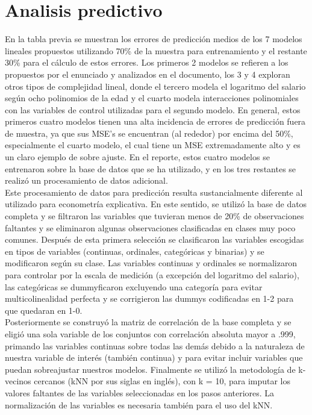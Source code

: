 \documentclass[12pt]{article}
\begin{document}
\section{Analisis predictivo}



En la tabla previa se muestran los errores de predicción medios de los 7 modelos lineales propuestos utilizando 70\% de la muestra para entrenamiento y el restante 30\% para el cálculo de estos errores. Los primeros 2 modelos se refieren a los propuestos por el enunciado y analizados en el documento, los 3 y 4 exploran otros tipos de complejidad lineal, donde el tercero modela el logaritmo del salario según ocho polinomios de la edad y el cuarto modela interacciones polinomiales con las variables de control utilizadas para el segundo modelo. En general, estos primeros cuatro modelos tienen una alta incidencia de errores de predicción fuera de muestra, ya que sus MSE’s se encuentran (al rededor) por encima del 50\%, especialmente el cuarto modelo, el cual tiene un MSE extremadamente alto y es un claro ejemplo de sobre ajuste. En el reporte, estos cuatro modelos se entrenaron sobre la base de datos que se ha utilizado, y en los tres restantes se realizó un procesamiento de datos adicional. \\

Este procesamiento de datos para predicción resulta sustancialmente diferente al utilizado para econometría explicativa. En este sentido, se utilizó la base de datos completa y se filtraron las variables que tuvieran menos de 20\% de observaciones faltantes y se eliminaron algunas observaciones clasificadas en clases muy poco comunes. Después de esta primera selección se clasificaron las variables escogidas en tipos de variables (continuas, ordinales, categóricas y binarias) y se modificaron según su clase. Las variables continuas y ordinales se normalizaron para controlar por la escala de medición (a excepción del logaritmo del salario), las categóricas se dummyficaron excluyendo una categoría para evitar multicolinealidad perfecta y se corrigieron las dummys codificadas en 1-2 para que quedaran en 1-0.  \\

Posteriormente se construyó la matriz de correlación de la base completa y se eligió una sola variable de los conjuntos con correlación absoluta mayor a .999, primando las variables continuas sobre todas las demás debido a la naturaleza de nuestra variable de interés (también continua) y para evitar incluir variables que puedan sobreajustar nuestros modelos. Finalmente se utilizó la metodología de k-vecinos cercanos (kNN por sus siglas en inglés), con k = 10, para imputar los valores faltantes de las variables seleccionadas en los pasos anteriores. La normalización de las variables es necesaria también para el uso del kNN. \\
\end{document}

